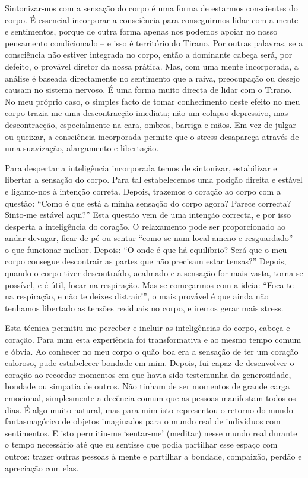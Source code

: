 Sintonizar-nos com a sensação do corpo é uma forma de estarmos
conscientes do corpo. É essencial incorporar a consciência para
conseguirmos lidar com a mente e sentimentos, porque de outra forma
apenas nos podemos apoiar no nosso pensamento condicionado -- e isso é
território do Tirano. Por outras palavras, se a consciência não estiver
integrada no corpo, então a dominante cabeça será, por defeito, o
provável diretor da nossa prática. Mas, com uma mente incorporada, a
análise é baseada directamente no sentimento que a raiva, preocupação ou
desejo causam no sistema nervoso. É uma forma muito directa de lidar com
o Tirano. No meu próprio caso, o simples facto de tomar conhecimento
deste efeito no meu corpo trazia-me uma descontracção imediata; não um
colapso depressivo, mas descontracção, especialmente na cara, ombros,
barriga e mãos. Em vez de julgar ou queixar, a consciência incorporada
permite que o stress desapareça através de uma suavização, alargamento e
libertação.

\sectionBreak

Para despertar a inteligência incorporada temos de sintonizar,
estabilizar e libertar a sensação do corpo. Para tal estabelecemos uma
posição direita e estável e ligamo-nos à intenção correta. Depois,
trazemos o coração ao corpo com a questão: “Como é que está a minha
sensação do corpo agora? Parece correcta? Sinto-me estável aqui?” Esta
questão vem de uma intenção correcta, e por isso desperta a inteligência
do coração. O relaxamento pode ser proporcionado ao andar devagar, ficar
de pé ou sentar “como se num local ameno e resguardado” -- o que
funcionar melhor. Depois: “O onde é que há equilíbrio? Será que o meu
corpo consegue descontrair as partes que não precisam estar tensas?”
Depois, quando o corpo tiver descontraído, acalmado e a sensação for
mais vasta, torna-se possível, e é útil, focar na respiração. Mas se
começarmos com a ideia: “Foca-te na respiração, e não te deixes
distrair!”, o mais provável é que ainda não tenhamos libertado as
tensões residuais no corpo, e iremos gerar mais stress.

Esta técnica permitiu-me perceber e incluir as inteligências do corpo,
cabeça e coração. Para mim esta experiência foi transformativa e ao
mesmo tempo comum e óbvia. Ao conhecer no meu corpo o quão boa era a
sensação de ter um coração caloroso, pude estabelecer bondade em mim.
Depois, fui capaz de desenvolver o coração ao recordar momentos em que
havia sido testemunha da generosidade, bondade ou simpatia de outros.
Não tinham de ser momentos de grande carga emocional, simplesmente a
decência comum que as pessoas manifestam todos os dias. É algo muito
natural, mas para mim isto representou o retorno do mundo fantasmagórico
de objetos imaginados para o mundo real de indivíduos com sentimentos. E
isto permitiu-me `sentar-me' (meditar) nesse mundo real durante o tempo
necessário até que eu sentisse que podia partilhar esse espaço com
outros: trazer outras pessoas à mente e partilhar a bondade, compaixão,
perdão e apreciação com elas.

